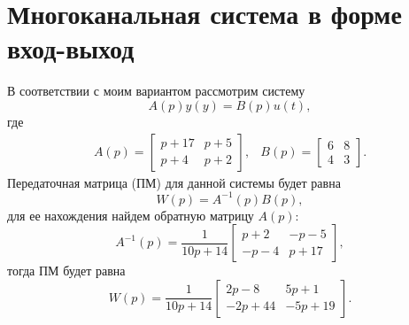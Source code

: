 \section{Многоканальная система в форме вход-выход}


В соответствии с моим вариантом рассмотрим систему
\begin{equation*}
    A(p)y(y)=B(p)u(t),
\end{equation*}
где
\begin{equation*}
    \begin{array}{cc}
        A(p)=\begin{bmatrix}
            p+17&p+5\\
            p+4&p+2
        \end{bmatrix}, &
        B(p)=\begin{bmatrix}
            6&8\\4&3
        \end{bmatrix}.        
    \end{array}
\end{equation*}
Передаточная матрица (ПМ) для данной системы будет равна
\begin{equation*}
    W(p)=A^{-1}(p)B(p),
\end{equation*}
для ее нахождения найдем обратную матрицу $A(p)$:
\begin{equation*}
    A^{-1}(p)=\frac{1}{10p+14}\begin{bmatrix}
        p+2&-p-5\\-p-4&p+17
    \end{bmatrix},
\end{equation*}
тогда ПМ будет равна
\begin{equation*}
    W(p)=\frac{1}{10p+14}\begin{bmatrix}
        2p-8&5p+1\\-2p+44&-5p+19
    \end{bmatrix}.
\end{equation*}


